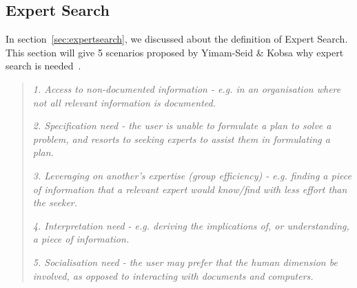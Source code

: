 \subsection{Expert Search}
In section~\ref{sec:expertsearch}, we discussed about the definition of Expert Search. This section will give 5 scenarios proposed by Yimam-Seid \& Kobsa
why expert search is needed~\cite[P. 387]{expertsearch}.
\begin{quotation}
  \item \textit{1. Access to non-documented information - e.g. in an organisation where not all relevant information is documented.}
  \item \textit{2. Specification need - the user is unable to formulate a plan to solve a problem, and resorts to seeking experts to assist them in formulating a plan.}
  \item \textit{3. Leveraging on another's expertise (group efficiency) - e.g. finding a piece of information that a relevant expert would know/find with
  less effort than the seeker.}
  \item \textit{4. Interpretation need - e.g. deriving the implications of, or understanding, a piece of information.}
  \item \textit{5. Socialisation need - the user may prefer that the human dimension be involved, as opposed to interacting with documents and computers.}
\end{quotation}

